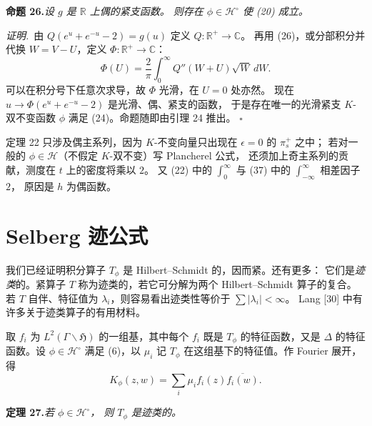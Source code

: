 \par\medskip\noindent\textbf{命题 26.}\quad\emph{设 $g$ 是 $\mathbb{R}$ 上偶的紧支函数。
则存在 $\phi\in\mathcal{H}^{\circ}$ 使 (20) 成立。}

\smallskip
\noindent\emph{证明.}\ 由 $Q(e^{u}+e^{-u}-2)=g(u)$ 定义 $Q:\mathbb{R}^{+}\to\mathbb{C}$。
再用 (26)，或分部积分并代换 $W=V-U$，定义 $\Phi:\mathbb{R}^{+}\to\mathbb{C}$：
\[
\Phi(U)=\frac{2}{\pi}\int_{0}^{\infty}Q''(W+U)\sqrt{W}\,dW .
\]
可以在积分号下任意次求导，故 $\Phi$ 光滑，在 $U=0$ 处亦然。
现在 $u\to\Phi(e^{u}+e^{-u}-2)$ 是光滑、偶、紧支的函数，
于是存在唯一的光滑紧支 $K$-双不变函数 $\phi$ 满足 (24)。命题随即由引理 24 推出。
\hfill$\square$

\begin{annote}
定理 22 只涉及偶主系列，因为 $K$-不变向量只出现在 $\epsilon=0$ 的 $\pi_{s}^{+}$ 之中；
若对一般的 $\phi\in\mathcal{H}$（不假定 $K$-双不变）写 Plancherel 公式，
还须加上奇主系列的贡献，测度在 $t$ 上的密度将乘以 $2$。
又 (22) 中的 $\int_{0}^{\infty}$ 与 (37) 中的 $\int_{-\infty}^{\infty}$ 相差因子 $2$，
原因是 $h$ 为偶函数。
\par{}
\end{annote}

\section{Selberg 迹公式}

我们已经证明积分算子 $T_{\phi}$ 是 Hilbert--Schmidt 的，因而紧。还有更多：
它们是\emph{迹类}的。紧算子 $T$ 称为迹类的，若它可分解为两个 Hilbert--Schmidt 算子的复合。
若 $T$ 自伴、特征值为 $\lambda_{i}$，则容易看出迹类性等价于 $\sum|\lambda_{i}|<\infty$。
Lang [30] 中有许多关于迹类算子的有用材料。

取 $f_{i}$ 为 $L^{2}(\Gamma\backslash\mathfrak{H})$ 的一组基，其中每个 $f_{i}$ 既是 $T_{\phi}$
的特征函数，又是 $\Delta$ 的特征函数。设 $\phi\in\mathcal{H}^{\circ}$ 满足 (6)，以 $\mu_{i}$
记 $T_{\phi}$ 在这组基下的特征值。作 Fourier 展开，得
\begin{equation}\tag{30}
K_{\phi}(z,w)=\sum_{i}\mu_{i}f_{i}(z)\overline{f_{i}(w)} .
\end{equation}

\par\medskip\noindent\textbf{定理 27.}\quad\emph{若 $\phi\in\mathcal{H}^{\circ}$，
则 $T_{\phi}$ 是迹类的。}

